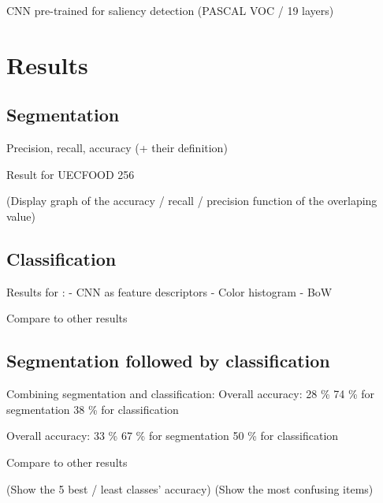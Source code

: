 \documentclass[aspectratio=169]{beamer}
\let\oldsection\section
\renewcommand{\section}[1]{
    \oldsection{#1}	
    \subsection{}
}
\newenvironment{myframe}[1][t]{\begin{frame}[#1]{\secname}{\subsecname}}{\end{frame}}
\begin{document}
    \begin{myframe}
        CNN pre-trained for saliency detection (PASCAL VOC / 19 layers)
    \end{myframe}
    
    \section{Results}
    
    \subsection{Segmentation}
    
    \begin{myframe}
        Precision, recall, accuracy (+ their definition)
        
        Result for UECFOOD 256
        
        (Display graph of the accuracy / recall / precision function of the overlaping value)
    \end{myframe}
    
    \subsection{Classification}
    
    \begin{myframe}
        Results for :
        - CNN as feature descriptors
        - Color histogram
        - BoW
        
        Compare to other results
    \end{myframe}
    
    \subsection{Segmentation followed by classification}
    
    \begin{myframe}
        Combining segmentation and classification:
        Overall accuracy: 28 \%
        74 \% for segmentation
        38 \% for classification
        
        Overall accuracy: 33 \%
        67 \% for segmentation
        50 \% for classification
        
        Compare to other results
        
        (Show the 5 best / least classes' accuracy)
        (Show the most confusing items)
    \end{myframe}
    
\end{document}
